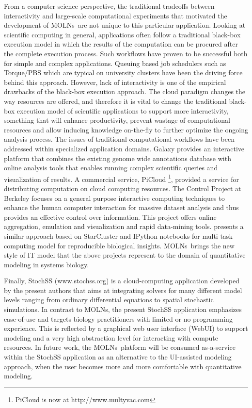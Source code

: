\documentclass[final,leqno,onefignum,onetabnum]{siamltex1213}
\def\packagename {MOLNs}
\begin{document}
From a computer science perspective, the traditional tradeoffs between interactivity and large-scale computational experiments that motivated the development of \packagename~are not unique to this particular application. Looking at scientific computing in general, applications often follow a traditional black-box execution model in which the results of the computation can be procured after the complete execution process. Such workflows have proven to be 
successful both for simple and complex applications. Queuing based job schedulers such as Torque/PBS which are typical on university clusters have been the driving 
force behind this approach. However, lack of interactivity is one of the empirical drawbacks of the
black-box execution approach. 
The cloud paradigm changes the way resources are offered, and  
therefore it is vital to change the traditional black-box execution model of scientific applications 
to support more interactivity, something that will enhance productivity, prevent wastage of computational 
resources and allow inducing knowledge on-the-fly to further optimize the ongoing analysis process. 
The issues of traditional computational workflows have been addressed within  specialized application domains. Galaxy \cite{giardine2005galaxy} provides an interactive platform that combines the existing genome wide annotations database with online analysis tools 
that enables running complex scientific queries and visualization of results. 
A commercial service, PiCloud \footnote{PiCloud is now at http://www.multyvac.com}\cite{picloud}, provided a service for distributing computation on cloud computing resources. The Control Project \cite{hellerstein1999interactive} at Berkeley focuses on a general purpose 
interactive computing techniques to enhance the human computer interaction for massive 
dataset analysis and thus provides an effective control over information. This project offers 
online aggregation, emulation and visualization and rapid data-mining tools. 
\cite{ragan2013collaborative} presents a similar approach based on StarCluster\cite{MITStarCluster} 
and IPython notebooks for multi-task computing model for reproducible biological insights. \packagename~brings the new style of IT model that the above projects represent to the domain of quantitative modeling in systems biology.  

Finally, StochSS (www.stochss.org) is a cloud-computing application developed by the present authors that aims at integrating solvers for many different model levels ranging from ordinary differential equations to spatial stochastic simulations. In contrast to \packagename, the present StochSS application emphasizes ease-of-use and targets biology practitioners with limited or no programming experience. This is reflected by a graphical web user interface (WebUI) to support modeling and a very high abstraction level for interacting with compute resources. In future work, the \packagename~platform will be consumed as-a-service within the StochSS application as an alternative to the UI-assisted modeling approach, when the user becomes more and more comfortable with quantitative modeling. 
\end{document}
